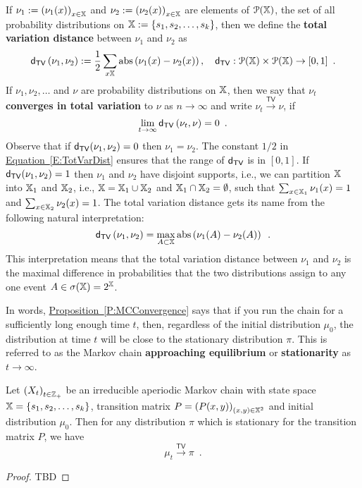 \begin{definition}\label{D:TotVarDist}
If $\nu_1:=\left(\nu_1(x)\right)_{x\in \mathbb{X}}$ and $\nu_2 := \left(\nu_2(x)\right)_{x\in \mathbb{X}}$ are elements of $\mathcal{P}(\mathbb{X})$, the set of all probability distributions on $\mathbb{X}:=\{s_1,s_2,\ldots,s_k\}$, then we define the {\bf total variation distance} between $\nu_1$ and $\nu_2$ as
\begin{equation}\label{E:TotVarDist}
\mathsf{d_{TV}} \left( \nu_1, \nu_2 \right) := \frac{1}{2} \sum_{x \mathbb{X}} \operatorname{abs} \left( \nu_1(x) - \nu_2(x) \right), \quad \mathsf{d_{TV}} : \mathcal{P}(\mathbb{X}) \times \mathcal{P}(\mathbb{X})  \to [0,1] \enspace .
\end{equation}
If $\nu_1, \nu_2, \ldots$ and $\nu$ are probability distributions on $\mathbb{X}$, then we say that $\nu_t$ {\bf converges in total variation} to $\nu$ as $n \to \infty$ and write $\nu_t  \overset{\mathsf{TV}}{\longrightarrow} \nu$, if
\[
\lim_{t \to \infty} \mathsf{d_{TV}} \left( \nu_t, \nu \right) = 0 \enspace .
\]
Observe that if $\mathsf{d_{TV}}(\nu_1,\nu_2)=0$ then $\nu_1=\nu_2$. The constant $1/2$ in \hyperref[E:TotVarDist]{Equation~\ref*{E:TotVarDist}} ensures that the range of $\mathsf{d_{TV}}$ is in $[0,1]$.  If $\mathsf{d_{TV}}(\nu_1,\nu_2)=1$ then $\nu_1$ and $\nu_2$ have disjoint  supports, i.e., we can partition $\mathbb{X}$ into $\mathbb{X}_1$ and $\mathbb{X}_2$, i.e., $\mathbb{X}=\mathbb{X}_1 \cup \mathbb{X}_2$ and $\mathbb{X}_1 \cap \mathbb{X}_2 = \emptyset$, such that $\sum_{x \in \mathbb{X}_1} \nu_1(x)=1$ and  $\sum_{x \in \mathbb{X}_2} \nu_2(x)=1$.  The total variation distance gets its name from the following natural interpretation:
\[
\mathsf{d_{TV}} \left( \nu_1, \nu_2 \right) = \max_{A \subset \mathbb{X}} \operatorname{abs} \left( \nu_1(A) - \nu_2(A) \right) \enspace .
\]
This interpretation means that the total variation distance between $\nu_1$ and $\nu_2$ is the maximal difference in probabilities that the two distributions assign to any one event $A \in \sigma(\mathbb{X}) = 2^{\mathbb{X}}$. 
\end{definition}

In words, \hyperref[P:MCConvergence]{Proposition~\ref*{P:MCConvergence}} says that if you run the chain for a sufficiently long enough time $t$, then, regardless of the initial distribution $\mu_0$, the distribution at time $t$ will be close to the stationary distribution $\pi$.  This is referred to as the Markov chain {\bf approaching equilibrium} or {\bf stationarity} as $t \to \infty$.  

\begin{prop}\label{P:MCConvergence}
Let $\left( X_t \right)_{t \in \mathbb{Z}_+}$ be an irreducible aperiodic Markov chain with state space $\mathbb{X}=\{s_1,s_2,\ldots,s_k\}$, transition matrix $P = \left( P(x,y) \right)_{(x,y) \in \mathbb{X}^2}$ and initial distribution $\mu_0$.  Then for any distribution $\pi$ which is stationary for the transition matrix $P$, we have
\begin{equation}
\mu_t \overset{\mathsf{TV}}{\longrightarrow} \pi  \enspace .
\end{equation}
\begin{proof}
TBD
\end{proof}
\end{prop}

